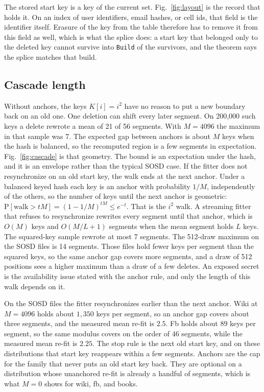 \documentclass[conference]{IEEEtran}
\begin{document}
The stored start key is a key of the current set.
Fig.~\ref{fig:layout} is the record that holds it.
On an index of user identifiers, email hashes, or cell ids, that field is the identifier itself.
Erasure of the key from the table therefore has to remove it from this field as well, which is what the splice does: a start key that belonged only to the deleted key cannot survive into \texttt{Build} of the survivors, and the theorem says the splice matches that build.

\subsection{Cascade length}

Without anchors, the keys $K[i]=i^{2}$ have no reason to put a new boundary back on an old one.
One deletion can shift every later segment.
On 200{,}000 such keys a delete rewrote a mean of 21 of 56 segments.
With $M=4096$ the maximum in that sample was 7.
The expected gap between anchors is about $M$ keys when the hash is balanced, so the recomputed region is a few segments in expectation.
Fig.~\ref{fig:cascade} is that geometry.
The bound is an expectation under the hash, and it is an envelope rather than the typical SOSD case.
If the fitter does not resynchronize on an old start key, the walk ends at the next anchor.
Under a balanced keyed hash each key is an anchor with probability $1/M$, independently of the others, so the number of keys until the next anchor is geometric:
$\mathrm{P}[\mathrm{walk}>tM]=(1-1/M)^{tM}\le e^{-t}$.
That is the $i^{2}$ walk.
A streaming fitter that refuses to resynchronize rewrites every segment until that anchor, which is $O(M)$ keys and $O(M/L+1)$ segments when the mean segment holds $L$ keys.
The squared-key sample rewrote at most 7 segments.
The 512-draw maximum on the SOSD files is 14 segments.
Those files hold fewer keys per segment than the squared keys, so the same anchor gap covers more segments, and a draw of 512 positions sees a higher maximum than a draw of a few deletes.
An exposed secret is the availability issue stated with the anchor rule, and only the length of this walk depends on it.

On the SOSD files the fitter resynchronizes earlier than the next anchor.
Wiki at $M=4096$ holds about $1{,}350$ keys per segment, so an anchor gap covers about three segments, and the measured mean re-fit is $2.5$.
Fb holds about $89$ keys per segment, so the same modulus covers on the order of $46$ segments, while the measured mean re-fit is $2.25$.
The stop rule is the next old start key, and on these distributions that start key reappears within a few segments.
Anchors are the cap for the family that never puts an old start key back.
They are optional on a distribution whose unanchored re-fit is already a handful of segments, which is what $M=0$ shows for wiki, fb, and books.
\end{document}
